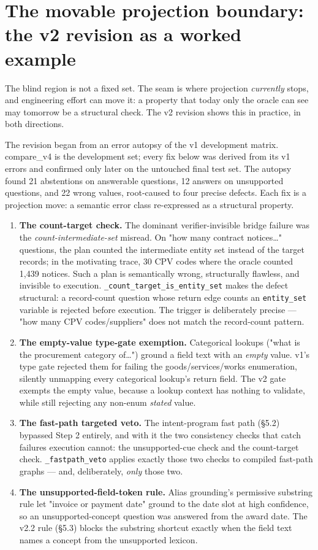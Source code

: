 \section{The movable projection boundary: the v2 revision as a worked example}\label{sec:the-movable-projection-boundary-the-v2-r}

The blind region is not a fixed set. The seam is where projection \emph{currently} stops, and engineering effort can move it: a property that today only the oracle can see may tomorrow be a structural check. The v2 revision shows this in practice, in both directions.

The revision began from an error autopsy of the v1 development matrix. compare\_v4 is the development set; every fix below was derived from its v1 errors and confirmed only later on the untouched final test set. The autopsy found 21 abstentions on answerable questions, 12 answers on unsupported questions, and 22 wrong values, root-caused to four precise defects. Each fix is a projection move: a semantic error class re-expressed as a structural property.

\begin{enumerate}
\item \textbf{The count-target check.} The dominant verifier-invisible bridge failure was the \emph{count-intermediate-set} misread. On "how many contract notices\ldots{}" questions, the plan counted the intermediate entity set instead of the target records; in the motivating trace, 30 CPV codes where the oracle counted 1,439 notices. Such a plan is semantically wrong, structurally flawless, and invisible to execution. \texttt{\_count\_target\_is\_entity\_set} makes the defect structural: a record-count question whose return edge counts an \texttt{entity\_set} variable is rejected before execution. The trigger is deliberately precise --- "how many CPV codes/suppliers" does not match the record-count pattern.
\item \textbf{The empty-value type-gate exemption.} Categorical lookups ("what is the procurement category of\ldots{}") ground a field text with an \emph{empty} value. v1's type gate rejected them for failing the goods/services/works enumeration, silently unmapping every categorical lookup's return field. The v2 gate exempts the empty value, because a lookup context has nothing to validate, while still rejecting any non-enum \emph{stated} value.
\item \textbf{The fast-path targeted veto.} The intent-program fast path (§5.2) bypassed Step 2 entirely, and with it the two consistency checks that catch failures execution cannot: the unsupported-cue check and the count-target check. \texttt{\_fastpath\_veto} applies exactly those two checks to compiled fast-path graphs --- and, deliberately, \emph{only} those two.
\item \textbf{The unsupported-field-token rule.} Alias grounding's permissive substring rule let "invoice or payment date" ground to the date slot at high confidence, so an unsupported-concept question was answered from the award date. The v2.2 rule (§5.3) blocks the substring shortcut exactly when the field text names a concept from the unsupported lexicon.
\end{enumerate}

